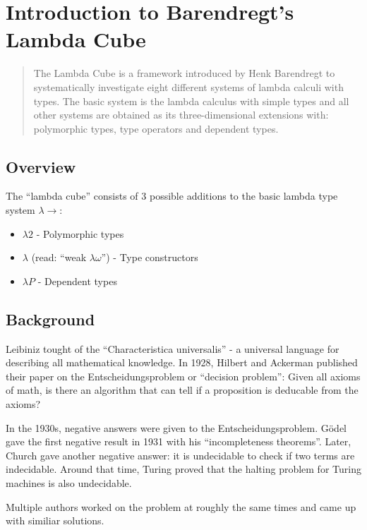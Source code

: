 \section{Introduction to Barendregt's Lambda Cube}
\begin{abstract}
	The Lambda Cube is a framework introduced by Henk Barendregt to systematically investigate eight different systems of lambda calculi with types. The basic system is the lambda calculus with simple types and all other systems are obtained as its three-dimensional extensions with: polymorphic types, type operators and dependent types.
\end{abstract}

\subsection{Overview}
The ``lambda cube'' consists of 3 possible additions to the basic lambda type system $\lambda\to$:
\begin{itemize}
	\item $\lambda2$ - Polymorphic types
	\item $\lambda$\underbar{$\omega$} (read: ``weak $\lambda\omega$'') - Type constructors
	\item $\lambda P$ - Dependent types
\end{itemize}

\subsection{Background}
Leibiniz tought of the ``Characteristica universalis'' - a universal language for describing all mathematical knowledge.
In 1928, Hilbert and Ackerman published their paper on the Entscheidungsproblem or ``decision problem'': Given all axioms
of math, is there an algorithm that can tell if a proposition is deducable from the axioms?

In the 1930s, negative answers were given to the Entscheidungsproblem. G\"odel gave the first negative result in 1931
with his ``incompleteness theorems''. Later, Church gave another negative answer: it is undecidable to check if
two \lc terms are indecidable. Around that time, Turing proved that the halting problem for Turing
machines is also undecidable.

Multiple authors worked on the problem at roughly the same times and came up with similiar solutions.

